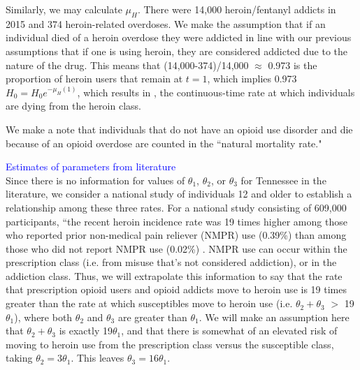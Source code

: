 \documentclass[12pt]{article}
\begin{document}
Similarly, we may calculate $\mu_{H}$. There were 14,000 heroin/fentanyl addicts in 2015 and 374 heroin-related overdoses. We make the assumption that if an individual died of a heroin overdose they were addicted in line with our previous assumptions that if one is using heroin, they are considered addicted due to the nature of the drug. This means that (14,000-374)/14,000 $\approx$ 0.973 is the proportion of heroin users that remain at $t=1$, which implies 0.973$H_0=H_0 e^{-\mu_{H}(1)}$, which results in  \unboldmath, the continuous-time rate at which individuals are dying from the heroin class.


We make a note that individuals that do not have an opioid use disorder and die because of an opioid overdose are counted in the ``natural mortality rate." 

\textcolor{blue}{Estimates of parameters from literature} \\
Since there is no information for values of $\theta_1$, $\theta_2$, or $\theta_3$ for Tennessee in the literature, we consider a national study of individuals 12 and older to establish a relationship among these three rates. For a national study consisting of 609,000 participants, ``the recent heroin incidence rate was 19 times higher among those who reported prior non-medical pain reliever (NMPR) use (0.39\%) than among those who did not report NMPR use (0.02\%) \cite{Muhuri}.
NMPR use can occur within the prescription class (i.e. from misuse that's not considered addiction), or in the addiction class. Thus, we will extrapolate this information to say that the rate that prescription opioid users and opioid addicts move to heroin use is 19 times greater than the rate at which susceptibles move to heroin use (i.e. $\theta_2 + \theta_3$ $>$ 19$\theta_1$), where both $\theta_2$ and $\theta_3$ are greater than $\theta_1.$ We will make an assumption here that $\theta_2 + \theta_3$ is exactly 19$\theta_1$, and that there is somewhat of an elevated risk of moving to heroin use from the prescription class versus the susceptible class, taking $\theta_2 =3 \theta_1$. This leaves $\theta_3=16\theta_1.$ \\
\end{document}
